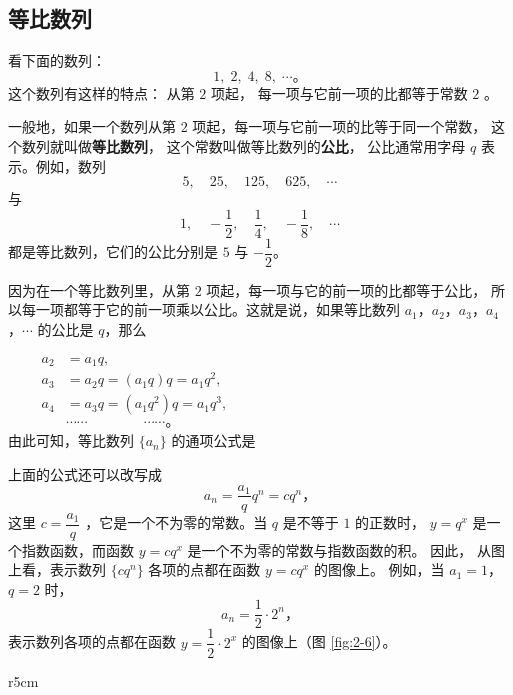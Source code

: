 \subsection{等比数列}\label{subsec:2-3}

看下面的数列：
$$ 1,\; 2,\; 4,\; 8,\; \cdots \text{。}$$
这个数列有这样的特点： 从第 $2$ 项起， 每一项与它前一项的比都等于常数 $2$ 。

一般地，如果一个数列从第 $2$ 项起，每一项与它前一项的比等于同一个常数，
这个数列就叫做\textbf{等比数列}， 这个常数叫做等比数列的\textbf{公比}，
公比通常用字母 $q$ 表示。例如，数列
$$ 5,\quad 25,\quad 125,\quad 625,\quad \cdots $$
与
$$ 1,\quad -\dfrac{1}{2},\quad \dfrac{1}{4},\quad -\dfrac{1}{8},\quad \cdots $$
都是等比数列，它们的公比分别是 $5$ 与 $-\dfrac{1}{2}$。

因为在一个等比数列里，从第 $2$ 项起，每一项与它的前一项的比都等于公比，
所以每一项都等于它的前一项乘以公比。这就是说，如果等比数列
$a_1$，$a_2$，$a_3$，$a_4$，$\cdots$ 的公比是 $q$，那么

$\qquad \begin{aligned}
    a_2 &= a_1 q, \\
    a_3 &= a_2 q = (a_1 q)q = a_1 q^2, \\
    a_4 &= a_3 q = (a_1 q^2)q = a_1 q^3, \\
    &\cdots\cdots \qquad\qquad \cdots\cdots \text{。}
\end{aligned}$ \\
由此可知，等比数列 $\{a_n\}$ 的通项公式是
\begin{center}
\end{center}

上面的公式还可以改写成
$$ a_n = \dfrac{a_1}{q} q^n = c q^n \text{，}$$
这里 $c = \dfrac{a_1}{q}$ ，它是一个不为零的常数。当 $q$ 是不等于 $1$ 的正数时，
$y = q^x$ 是一个指数函数，而函数 $y = c q^x$ 是一个不为零的常数与指数函数的积。
因此， 从图上看，表示数列 $\{c q^n\}$ 各项的点都在函数 $y = c q^x$ 的图像上。
例如，当 $a_1 = 1$，$q = 2$ 时，
$$ a_n = \dfrac{1}{2} \cdot 2^n \text{，}$$
表示数列各项的点都在函数 $y = \dfrac{1}{2} \cdot 2^x$ 的图像上（图 \ref{fig:2-6}）。

\begin{wrapfigure}[22]{r}{5cm}
    \centering
    
    \caption{}\label{fig:2-6}
\end{wrapfigure}

